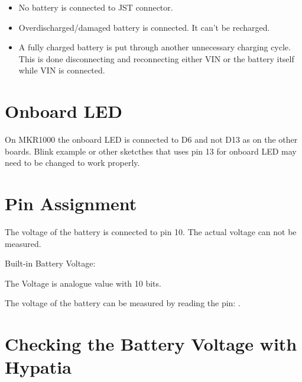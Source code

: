 \begin{itemize}
    \item  No battery is connected to JST connector.
    \item  Overdischarged/damaged battery is connected. It can't be recharged.
    \item A fully charged battery is put through another unnecessary charging cycle. This is done disconnecting and reconnecting either VIN or the battery itself while VIN is connected.
\end{itemize}

\section{Onboard LED}

On MKR1000 the onboard LED is connected to D6 and not D13 as on the other boards. Blink example or other sketcthes that uses pin 13 for onboard LED may need to be changed to work properly.
    

\section{Pin Assignment}

The voltage of the battery is connected to pin 10. The actual voltage can not be measured. 

\begin{description}
    \item [Built-in Battery Voltage:] 
\end{description}

The Voltage is analogue value with 10 bits.


The voltage of the battery can be measured by reading the pin: .





\section{Checking the Battery Voltage with Hypatia}


 

